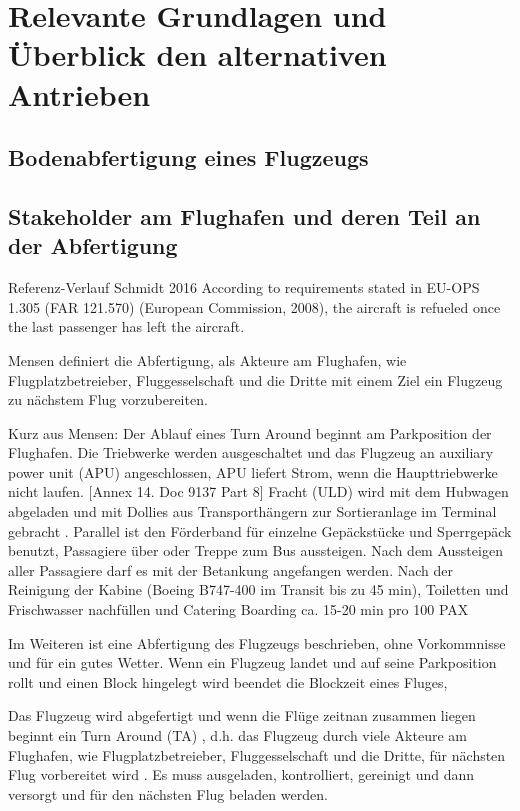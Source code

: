 \chapter{Relevante Grundlagen und Überblick den alternativen Antrieben}
\label{ch:Relevante Grundlagen und Überblick den alternativen Antrieben}

\section{Bodenabfertigung eines Flugzeugs}
\label{s:Bodenabfertigung eines Flugzeugs}

\section{Stakeholder am Flughafen und deren Teil an der Abfertigung}


Referenz-Verlauf
Schmidt 2016 
According to requirements stated in EU-OPS 1.305 (FAR 121.570)
 (European Commission, 2008), the aircraft is refueled once the last
 passenger has left the aircraft.


Mensen definiert die Abfertigung, als Akteure am Flughafen, wie Flugplatzbetreieber, Fluggesselschaft und die Dritte mit einem Ziel ein 
Flugzeug zu nächstem Flug vorzubereiten. 

Kurz aus Mensen:
Der Ablauf eines Turn Around beginnt am Parkposition der Flughafen. Die Triebwerke werden ausgeschaltet 
und das Flugzeug an auxiliary power unit (APU) angeschlossen, APU liefert Strom, wenn die Haupttriebwerke nicht laufen. 
[Annex 14. Doc 9137 Part 8]  
Fracht (ULD) wird mit dem Hubwagen abgeladen und mit Dollies aus Transporthängern zur Sortieranlage im Terminal gebracht \cite{mensen2013handbuch}.
Parallel ist den Förderband für einzelne Gepäckstücke und Sperrgepäck benutzt, Passagiere über oder Treppe zum Bus aussteigen.
Nach dem Aussteigen aller Passagiere darf es mit der Betankung angefangen werden. 
Nach der Reinigung der Kabine (Boeing B747-400 im Transit bis zu 45 min), Toiletten und Frischwasser nachfüllen und Catering
Boarding ca. 15-20 min pro 100 PAX

Im Weiteren ist eine Abfertigung des Flugzeugs beschrieben, ohne Vorkommnisse und für ein gutes Wetter.
Wenn ein Flugzeug landet und auf seine Parkposition rollt und einen Block hingelegt wird beendet die Blockzeit eines Fluges, 

Das Flugzeug wird abgefertigt und wenn die Flüge zeitnan zusammen liegen beginnt ein Turn Around (TA) \cite{mensen2013handbuch}, 
d.h. das Flugzeug durch viele Akteure am Flughafen, wie Flugplatzbetreieber, Fluggesselschaft und die Dritte, für 
nächsten Flug vorbereitet wird \cite{mensen2013handbuch}.
Es muss ausgeladen, kontrolliert, gereinigt und dann versorgt und für den nächsten Flug beladen werden. 


